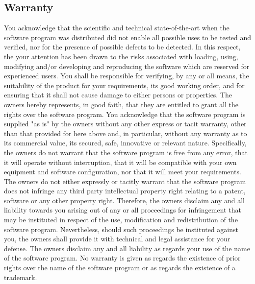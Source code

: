 \documentclass[11p,a4paper]{article}
\begin{document}
\subsection{Warranty}
You acknowledge that the scientific and technical state-of-the-art when the software program was distributed did not enable all possible uses to be tested and verified, nor for the presence of possible defects to be detected. In this respect, the your attention has been drawn to the risks associated with loading, using, modifying and/or developing and reproducing the software which are reserved for experienced users.
You shall be responsible for verifying, by any or all means, the suitability of the product for your requirements, its good working order, and for ensuring that it shall not cause damage to either persons or properties.
The owners hereby represents, in good faith, that they are entitled to grant all the rights over the software program. You acknowledge that the software program is supplied "as is" by the owners without any other express or tacit warranty, other than that provided for here above and, in particular, without any warranty as to its commercial value, its secured, safe, innovative or relevant nature. Specifically, the owners do not warrant that the software program is free from any error, that it will operate without interruption, that it will be compatible with your own equipment and software configuration, nor that it will meet your requirements.
The owners do not either expressly or tacitly warrant that the
software program does not infringe any third party intellectual property right relating to a patent, software or any other property right. Therefore, the owners disclaim any and all liability towards you arising out of any or all proceedings for infringement that may be instituted in respect of the use, modification and redistribution of the software program. Nevertheless, should such proceedings be instituted against you, the owners shall provide it with technical and legal assistance for your defense. The owners disclaim any and all liability as regards your use of the name of the software program. No warranty is given as regards the existence of
prior rights over the name of the software program or as regards the existence of a trademark.



\end{document}
